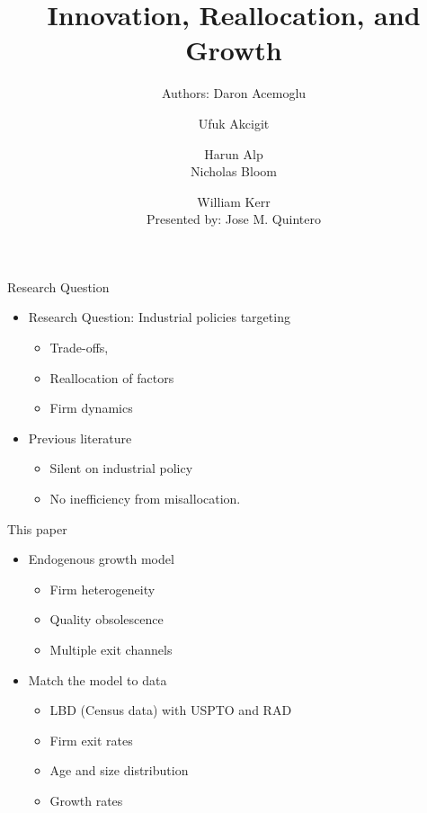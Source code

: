 \documentclass[usenames,dvipsnames,aspectratio=169]{beamer}
\title{Innovation, Reallocation, and Growth}
\author{Authors: Daron Acemoglu \and  Ufuk Akcigit \and Harun Alp \\ Nicholas Bloom \and William Kerr \\ \small{Presented by: Jose M. Quintero} }
\begin{document}
\begin{frame}
  \titlepage
\end{frame}

\begin{frame}{Research Question}
\begin{itemize}[label=\textcolor{teal}{$\blacktriangleright$}]
\vfill
\item Research Question: Industrial policies targeting 
\begin{itemize}[label=\textcolor{teal}{$\star$}]
\item Trade-offs,
\item Reallocation of factors
\item Firm dynamics
\end{itemize}
\vfill
\item Previous literature 
\begin{itemize}[label=\textcolor{teal}{$\star$}]
\item Silent on industrial policy
\item No inefficiency from misallocation.
\end{itemize}
\vfill
\end{itemize}
\end{frame}

\begin{frame}{This paper}
\begin{itemize}[label=\textcolor{teal}{$\blacktriangleright$}]

\vfill
\item Endogenous growth model
\begin{itemize}[label=\textcolor{teal}{$\star$}]
\item Firm heterogeneity
\item Quality obsolescence
\item Multiple exit channels
\end{itemize}
\vfill
\item Match the model to data
\begin{itemize}[label=\textcolor{teal}{$\star$}]
\item LBD (Census data) with USPTO and RAD
\item Firm exit rates
\item Age and size distribution
\item Growth rates
\end{itemize}
\end{itemize}
\end{frame}
\end{document}
